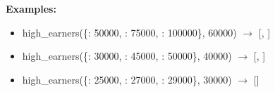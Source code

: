 	\textbf{Examples:}  
	\begin{itemize}  
		\item high\_earners(\{: 50000, : 75000, : 100000\}, 60000) $\rightarrow$ [, ]
		\item high\_earners(\{: 30000, : 45000, : 50000\}, 40000) $\rightarrow$ [, ]
		\item high\_earners(\{: 25000, : 27000, : 29000\}, 30000) $\rightarrow$ []
	\end{itemize}



